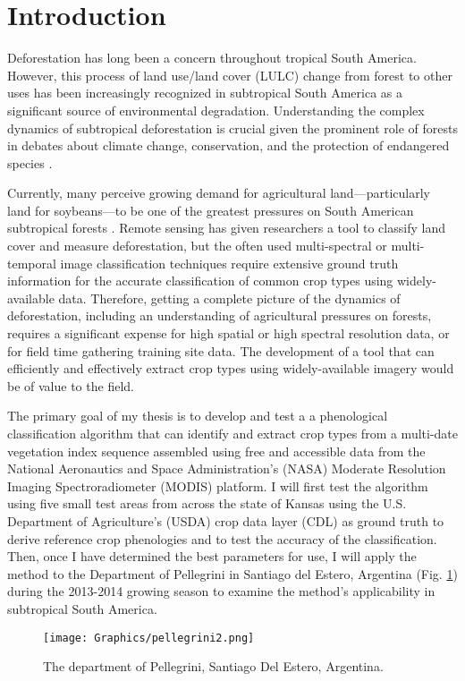 \section*{Introduction}
Deforestation has long been a concern throughout tropical South America. However, this process of land use/land cover (LULC) change from forest to other uses has been increasingly recognized in subtropical South America as a significant source of environmental degradation. Understanding the complex dynamics of subtropical deforestation is crucial given the prominent role of forests in debates about climate change, conservation, and the protection of endangered species \autocites{geist2002proximate}{zak2004do-subtropical}{bonnie2000counting}{houghton1994the-worldwide}{sala2000global}.

Currently, many perceive growing demand for agricultural land---particularly land for soybeans---to be one of the greatest pressures on South American subtropical forests \autocites{pengue2005transgenic}{grau2005agriculture}{altieri2006gm-soybean:}. Remote sensing has given researchers a tool to classify land cover and measure deforestation, but the often used multi-spectral or multi-temporal image classification techniques require extensive ground truth information for the accurate classification of common crop types using widely-available data. Therefore, getting a complete picture of the dynamics of deforestation, including an understanding of agricultural pressures on forests, requires a significant expense for high spatial or high spectral resolution data, or for field time gathering training site data. The development of a tool that can efficiently and effectively extract crop types using widely-available imagery would be of value to the field.

The primary goal of my thesis is to develop and test a a phenological classification algorithm that can identify and extract crop types from a multi-date vegetation index sequence assembled using free and accessible data from the National Aeronautics and Space Administration’s (NASA) Moderate Resolution Imaging Spectroradiometer (MODIS) platform. I will first test the algorithm using five small test areas from across the state of Kansas using the U.S. Department of Agriculture's (USDA) crop data layer (CDL) as ground truth to derive reference crop phenologies and to test the accuracy of the classification. Then, once I have determined the best parameters for use, I will apply the method to the Department of Pellegrini in Santiago del Estero, Argentina (Fig. \ref{fig:pellegrini}) during the 2013-2014 growing season to examine the method's applicability in subtropical South America.

\begin{figure}[H]
  \centering
  \texttt{[image: Graphics/pellegrini2.png]}
  \caption{The department of Pellegrini, Santiago Del Estero, Argentina.}
  \label{fig:pellegrini}
\end{figure}
